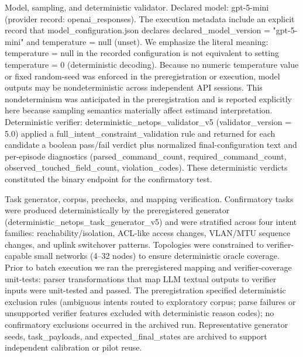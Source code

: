 \documentclass[conference]{IEEEtran}
\begin{document}
Model, sampling, and deterministic validator. Declared model: gpt-5-mini (provider record: openai\_responses). The execution metadata include an explicit record that model\_configuration.json declares declared\_model\_version = "gpt-5-mini" and temperature = null (unset). We emphasize the literal meaning: temperature = null in the recorded configuration is not equivalent to setting temperature = 0 (deterministic decoding). Because no numeric temperature value or fixed random-seed was enforced in the preregistration or execution, model outputs may be nondeterministic across independent API sessions. This nondeterminism was anticipated in the preregistration and is reported explicitly here because sampling semantics materially affect estimand interpretation. Deterministic verifier: deterministic\_netops\_validator\_v5 (validator\_version = 5.0) applied a full\_intent\_constraint\_validation rule and returned for each candidate a boolean pass/fail verdict plus normalized final-configuration text and per-episode diagnostics (parsed\_command\_count, required\_command\_count, observed\_touched\_field\_count, violation\_codes). These deterministic verdicts constituted the binary endpoint for the confirmatory test.

Task generator, corpus, prechecks, and mapping verification. Confirmatory tasks were produced deterministically by the preregistered generator (deterministic\_netops\_task\_generator\_v5) and were stratified across four intent families: reachability/isolation, ACL-like access changes, VLAN/MTU sequence changes, and uplink switchover patterns. Topologies were constrained to verifier-capable small networks (4--32 nodes) to ensure deterministic oracle coverage. Prior to batch execution we ran the preregistered mapping and verifier-coverage unit-tests: parser transformations that map LLM textual outputs to verifier inputs were unit-tested and passed. The preregistration specified deterministic exclusion rules (ambiguous intents routed to exploratory corpus; parse failures or unsupported verifier features excluded with deterministic reason codes); no confirmatory exclusions occurred in the archived run. Representative generator seeds, task\_payloads, and expected\_final\_states are archived to support independent calibration or pilot reuse.
\end{document}
